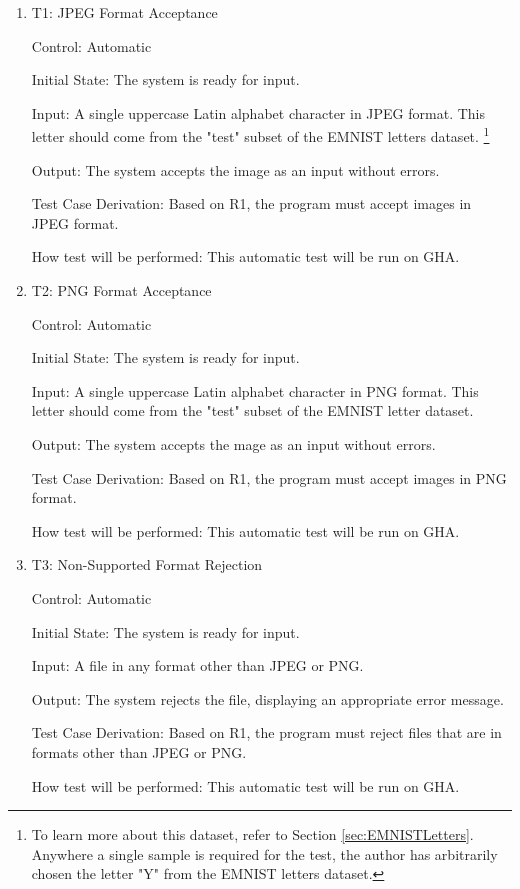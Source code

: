 \documentclass[12pt, titlepage]{article}
\begin{document}
\begin{enumerate}

\item{T1: JPEG Format Acceptance\\}

Control: Automatic

Initial State: The \progname{} system is ready for input.

Input: A single uppercase Latin alphabet character in JPEG format. This letter
should come from the "test" subset of the EMNIST letters dataset. \footnote{
  To learn more about this dataset, refer to Section \ref{sec:EMNISTLetters}.
  Anywhere a single sample is required for the test, the author has arbitrarily
  chosen the letter "Y" from the EMNIST letters dataset.
}

Output: The system accepts the image as an input without errors.

Test Case Derivation: Based on R1, the program must accept images in JPEG
format.

How test will be performed: This automatic test will be run on GHA.

\item{T2: PNG Format Acceptance\\}

Control: Automatic

Initial State: The \progname{} system is ready for input.

Input: A single uppercase Latin alphabet character in PNG format. This letter
should come from the "test" subset of the EMNIST letter dataset.

Output: The system accepts the mage as an input without errors.

Test Case Derivation: Based on R1, the program must accept images in PNG format.

How test will be performed: This automatic test will be run on GHA.

\item{T3: Non-Supported Format Rejection \\}

Control: Automatic

Initial State: The \progname{} system is ready for input.

Input: A file in any format other than JPEG or PNG.

Output: The system rejects the file, displaying an appropriate error message.

Test Case Derivation: Based on R1, the program must reject files that are in
formats other than JPEG or PNG.

How test will be performed: This automatic test will be run on GHA.

\end{enumerate}
\end{document}
